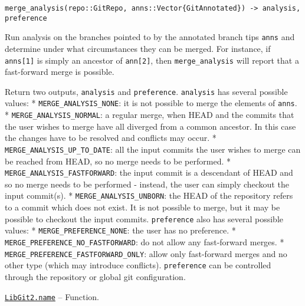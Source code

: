 \begin{adjustwidth}{2em}{0pt}


\begin{verbatim}
merge_analysis(repo::GitRepo, anns::Vector{GitAnnotated}) -> analysis, preference
\end{verbatim}

Run analysis on the branches pointed to by the annotated branch tips \texttt{anns} and determine under what circumstances they can be merged. For instance, if \texttt{anns[1]} is simply an ancestor of \texttt{ann[2]}, then \texttt{merge\_analysis} will report that a fast-forward merge is possible.

Return two outputs, \texttt{analysis} and \texttt{preference}. \texttt{analysis} has several possible values:     * \texttt{MERGE\_ANALYSIS\_NONE}: it is not possible to merge the elements of \texttt{anns}.     * \texttt{MERGE\_ANALYSIS\_NORMAL}: a regular merge, when HEAD and the commits that the       user wishes to merge have all diverged from a common ancestor. In this case the       changes have to be resolved and conflicts may occur.     * \texttt{MERGE\_ANALYSIS\_UP\_TO\_DATE}: all the input commits the user wishes to merge can       be reached from HEAD, so no merge needs to be performed.     * \texttt{MERGE\_ANALYSIS\_FASTFORWARD}: the input commit is a descendant of HEAD and so no       merge needs to be performed - instead, the user can simply checkout the       input commit(s).     * \texttt{MERGE\_ANALYSIS\_UNBORN}: the HEAD of the repository refers to a commit which does not       exist. It is not possible to merge, but it may be possible to checkout the input       commits. \texttt{preference} also has several possible values:     * \texttt{MERGE\_PREFERENCE\_NONE}: the user has no preference.     * \texttt{MERGE\_PREFERENCE\_NO\_FASTFORWARD}: do not allow any fast-forward merges.     * \texttt{MERGE\_PREFERENCE\_FASTFORWARD\_ONLY}: allow only fast-forward merges and no       other type (which may introduce conflicts). \texttt{preference} can be controlled through the repository or global git configuration.



\end{adjustwidth}
\hypertarget{2421524004789353091}{}
\hyperlink{2421524004789353091}{\texttt{LibGit2.name}}  -- {Function.}

